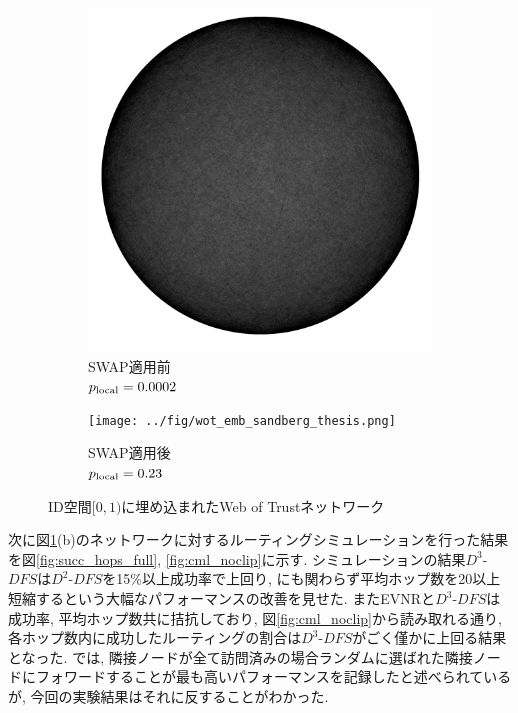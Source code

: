 \documentclass[dvipdfmx]{ampbt}
\begin{document}
   \begin{figure}[htbp]
    \centering
    \begin{subfigure}[b]{0.48\textwidth}
        \includegraphics[width=\textwidth]{../fig/wot_default_random_thesis.png}
        \caption{SWAP適用前 \\ $p_{\rm{local}} = 0.0002$}
    \end{subfigure}
    \begin{subfigure}[b]{0.48\textwidth}
        \texttt{[image: ../fig/wot\_emb\_sandberg\_thesis.png]}
        \caption{SWAP適用後 \\ $p_{\rm{local}} = 0.23$}
    \end{subfigure}
    \caption{ID空間$[0,1)$に埋め込まれたWeb of Trustネットワーク}
    \label{fig:wot_emb}
   \end{figure}

   次に図\ref{fig:wot_emb}(b)のネットワークに対するルーティングシミュレーションを行った結果を図\ref{fig:succ_hops_full}, \ref{fig:cml_noclip}に示す.  シミュレーションの結果$D^3$-$DFS$は$D^2$-$DFS$を15\%以上成功率で上回り, にも関わらず平均ホップ数を20以上短縮するという大幅なパフォーマンスの改善を見せた. またEVNRと$D^3$-$DFS$は成功率, 平均ホップ数共に拮抗しており, 図\ref{fig:cml_noclip}から読み取れる通り, 各ホップ数内に成功したルーティングの割合は$D^3$-$DFS$がごく僅かに上回る結果となった. \cite{simsek2008navigating}では, 隣接ノードが全て訪問済みの場合ランダムに選ばれた隣接ノードにフォワードすることが最も高いパフォーマンスを記録したと述べられているが, 今回の実験結果はそれに反することがわかった.
\end{document}
